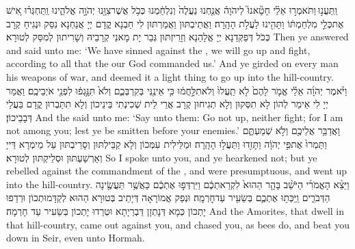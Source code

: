{וַֽתַּעֲנ֣וּ \legarmeh  וַתֹּאמְר֣וּ אֵלַ֗י חָטָ֘אנוּ֮ לַיהֹוָה֒ אֲנַ֤חְנוּ נַעֲלֶה֙ וְנִלְחַ֔מְנוּ כְּכֹ֥ל אֲשֶׁר\maqqaf צִוָּ֖נוּ יְהֹוָ֣ה אֱלֹהֵ֑ינוּ וַֽתַּחְגְּר֗וּ אִ֚ישׁ אֶת\maqqaf כְּלֵ֣י מִלְחַמְתּ֔וֹ וַתָּהִ֖ינוּ לַעֲלֹ֥ת הָהָֽרָה׃}
{וַאֲתֵיבְתּוּן וַאֲמַרְתּוּן לִי חַבְנָא קֳדָם יְיָ אֲנַחְנָא נִסַּק וּנְגִיחַ קְרָב כְּכֹל דְּפַקְּדַנָא יְיָ אֱלָהַנָא וְזָרֵיזְתּוּן גְּבַר יָת מָאנֵי קְרָבֵיהּ וְשָׁרִיתוּן לְמִסַּק לְטוּרָא׃}
{Then ye answered and said unto me: ‘We have sinned against the \lord, we will go up and fight, according to all that the \lord\space our God commanded us.’ And ye girded on every man his weapons of war, and deemed it a light thing to go up into the hill-country.}{}
{וַיֹּ֨אמֶר יְהֹוָ֜ה אֵלַ֗י אֱמֹ֤ר לָהֶם֙ לֹ֤א תַֽעֲלוּ֙ וְלֹא\maqqaf תִלָּ֣חֲמ֔וּ כִּ֥י אֵינֶ֖נִּי בְּקִרְבְּכֶ֑ם וְלֹא֙ תִּנָּ֣גְפ֔וּ לִפְנֵ֖י אֹיְבֵיכֶֽם׃}
{וַאֲמַר יְיָ לִי אֵימַר לְהוֹן לָא תִסְּקוּן וְלָא תְגִיחוּן קְרָב אֲרֵי לֵית שְׁכִינְתִי בֵּינֵיכוֹן וְלָא תִתַּבְרוּן קֳדָם בַּעֲלֵי דְּבָבֵיכוֹן׃}
{And the \lord\space said unto me: ‘Say unto them: Go not up, neither fight; for I am not among you; lest ye be smitten before your enemies.’}{}
{וָאֲדַבֵּ֥ר אֲלֵיכֶ֖ם וְלֹ֣א שְׁמַעְתֶּ֑ם וַתַּמְרוּ֙ אֶת\maqqaf פִּ֣י יְהֹוָ֔ה וַתָּזִ֖דוּ וַתַּעֲל֥וּ הָהָֽרָה׃}
{וּמַלֵּילִית עִמְּכוֹן וְלָא קַבֵּילְתּוּן וְסָרֵיבְתּוּן עַל מֵימְרָא דַּייָ וְאַרְשַׁעְתּוּן וּסְלֵיקְתּוּן לְטוּרָא׃}
{So I spoke unto you, and ye hearkened not; but ye rebelled against the commandment of the \lord, and were presumptuous, and went up into the hill-country.}{}
{וַיֵּצֵ֨א הָאֱמֹרִ֜י הַיֹּשֵׁ֨ב בָּהָ֤ר הַהוּא֙ לִקְרַאתְכֶ֔ם וַיִּרְדְּפ֣וּ אֶתְכֶ֔ם כַּאֲשֶׁ֥ר תַּעֲשֶׂ֖ינָה הַדְּבֹרִ֑ים וַֽיַּכְּת֥וּ אֶתְכֶ֛ם בְּשֵׂעִ֖יר עַד\maqqaf חׇרְמָֽה׃}
{וּנְפַק אֱמוֹרָאָה דְּיָתֵיב בְּטוּרָא הַהוּא לְקַדָּמוּתְכוֹן וּרְדַפוּ יָתְכוֹן כְּמָא דְּנָתְזָן דַּבְרַיָתָא וּטְרַדוּ יָתְכוֹן בְּשֵׂעִיר עַד חָרְמָה׃}
{And the Amorites, that dwell in that hill-country, came out against you, and chased you, as bees do, and beat you down in Seir, even unto Hormah.}{}
